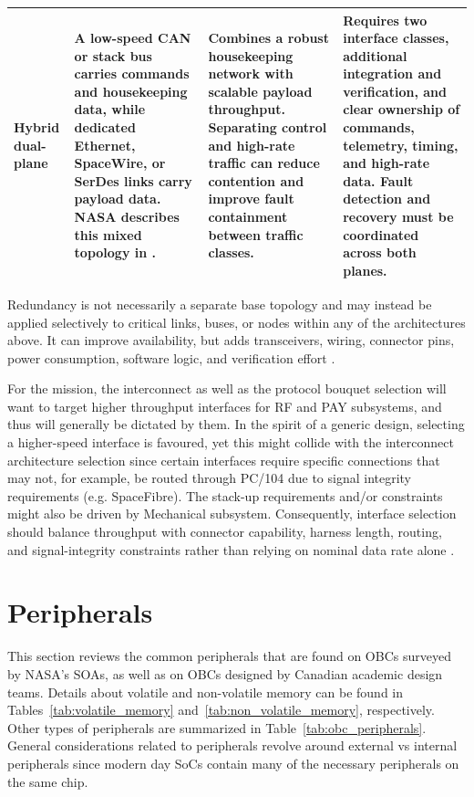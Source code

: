 \documentclass[10pt]{../datasheet}
\let\cite\citep
\begin{document}
\begin{longtable}{|
  >{\raggedright\arraybackslash}p{3.0cm}|
  >{\raggedright\arraybackslash}p{4.5cm}|
  >{\raggedright\arraybackslash}p{4.1cm}|
  >{\raggedright\arraybackslash}p{4.0cm}|}
  Hybrid dual-plane                                              &
  A low-speed CAN or stack bus carries commands and housekeeping data, while
  dedicated Ethernet, SpaceWire, or SerDes links carry payload data. NASA
  describes this mixed topology in
  \cite[pp.~222--223]{nasa_soa_2026}.                            &
  Combines a robust housekeeping network with scalable payload throughput.
  Separating control and high-rate traffic can reduce contention and improve
  fault containment between traffic classes.                     &
  Requires two interface classes, additional integration and verification, and
  clear ownership of commands, telemetry, timing, and high-rate data. Fault
  detection and recovery must be coordinated across both planes.                        \\ \hline
\end{longtable}

Redundancy is not necessarily a separate base topology and may instead be
applied selectively to critical links, buses, or nodes within any of the
architectures above. It can improve availability, but adds transceivers,
wiring, connector pins, power consumption, software logic, and verification
effort \cite{nasa_soa_2026,ecss_canbus}.

For the mission, the interconnect as well as the protocol bouquet selection will
want to target higher throughput interfaces for RF and PAY subsystems, and thus
will generally be dictated by them. In the spirit of a generic design, selecting
a higher-speed interface is favoured, yet this might collide with the
interconnect architecture selection since certain interfaces require specific
connections that may not, for example, be routed through PC/104 due to signal
integrity requirements (e.g. SpaceFibre). The stack-up requirements and/or
constraints might also be driven by Mechanical subsystem.
Consequently, interface selection should balance throughput with connector
capability, harness length, routing, and signal-integrity constraints rather
than relying on nominal data rate alone \cite{ecss_spacewire,ecss_spacefibre}.

\section{Peripherals}

This section reviews the common peripherals that are found on OBCs surveyed by
NASA's SOAs, as well as on OBCs designed by Canadian academic design teams. Details about volatile and non-volatile memory can be found in Tables~\ref{tab:volatile_memory} and~\ref{tab:non_volatile_memory}, respectively. Other types of peripherals are summarized in Table~\ref{tab:obc_peripherals}. General considerations related to peripherals revolve around external vs internal peripherals since modern day SoCs contain
many of the necessary peripherals on the same chip.
\end{document}
